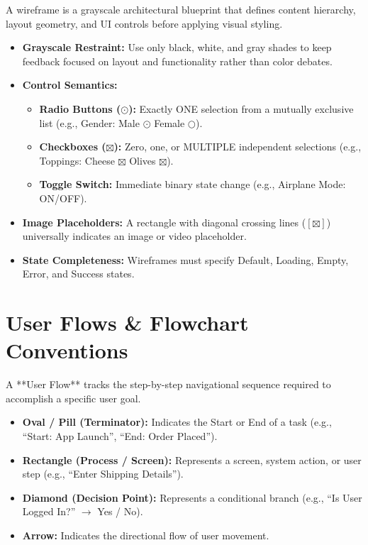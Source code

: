 A wireframe is a grayscale architectural blueprint that defines content hierarchy, layout geometry, and UI controls before applying visual styling.

\begin{keyequation}
\begin{itemize}[leftmargin=1.2em, itemsep=2pt]
    \item \textbf{Grayscale Restraint:} Use only black, white, and gray shades to keep feedback focused on layout and functionality rather than color debates.
    \item \textbf{Control Semantics:}
    \begin{itemize}
        \item \textbf{Radio Buttons ($\odot$):} Exactly ONE selection from a mutually exclusive list (e.g., Gender: Male $\odot$ Female $\bigcirc$).
        \item \textbf{Checkboxes ($\boxtimes$):} Zero, one, or MULTIPLE independent selections (e.g., Toppings: Cheese $\boxtimes$ Olives $\boxtimes$).
        \item \textbf{Toggle Switch:} Immediate binary state change (e.g., Airplane Mode: ON/OFF).
    \end{itemize}
    \item \textbf{Image Placeholders:} A rectangle with diagonal crossing lines ($[\boxtimes]$) universally indicates an image or video placeholder.
    \item \textbf{State Completeness:} Wireframes must specify Default, Loading, Empty, Error, and Success states.
\end{itemize}
\end{keyequation}

\section{User Flows \& Flowchart Conventions}

A **User Flow** tracks the step-by-step navigational sequence required to accomplish a specific user goal.
\begin{itemize}[leftmargin=1.2em, itemsep=3pt]
    \item \textbf{Oval / Pill (Terminator):} Indicates the Start or End of a task (e.g., ``Start: App Launch'', ``End: Order Placed'').
    \item \textbf{Rectangle (Process / Screen):} Represents a screen, system action, or user step (e.g., ``Enter Shipping Details'').
    \item \textbf{Diamond (Decision Point):} Represents a conditional branch (e.g., ``Is User Logged In?'' $\rightarrow$ Yes / No).
    \item \textbf{Arrow:} Indicates the directional flow of user movement.
\end{itemize}

